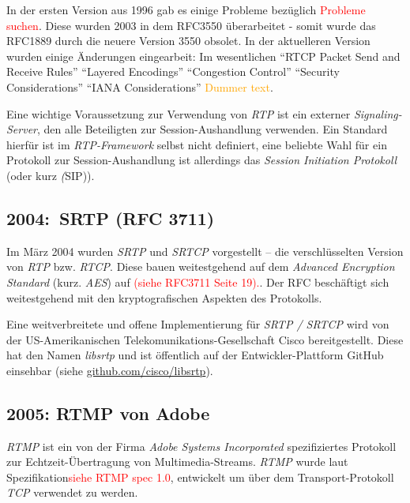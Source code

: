 \documentclass[journal]{IEEEtran}
\begin{document}
\begin{twocolumn}
In der ersten Version aus 1996 gab es einige Probleme bezüglich
\textcolor{red}{Probleme suchen}. Diese wurden 2003 in dem RFC3550
überarbeitet - somit wurde das RFC1889 durch die neuere Version 3550 obsolet.
In der aktuelleren Version wurden einige Änderungen eingearbeit: Im
wesentlichen ``RTCP Packet Send and Receive Rules'' ``Layered Encodings''
``Congestion Control'' ``Security Considerations'' ``IANA Considerations''
\textcolor{orange}{Dummer text}.

Eine wichtige Voraussetzung zur Verwendung von \textit{RTP} ist ein externer
\textit{Signaling-Server}, den alle Beteiligten zur Session-Aushandlung
verwenden. Ein Standard hierfür ist im \textit{RTP-Framework} selbst nicht
definiert, eine beliebte Wahl für ein Protokoll zur Session-Aushandlung ist
allerdings das \textit{Session Initiation Protokoll} (oder kurz \textit(SIP)).

\subsection{2004:\ SRTP (RFC 3711)}

Im März 2004 wurden \textit{SRTP} und \textit{SRTCP} vorgestellt – die
verschlüsselten Version von \textit{RTP} bzw. \textit{RTCP}. Diese bauen
weitestgehend auf dem \textit{Advanced Encryption Standard} (kurz.
\textit{AES}) auf \textcolor{red}{(siehe RFC3711 Seite 19).}. Der RFC
beschäftigt sich weitestgehend mit den kryptografischen Aspekten des
Protokolls.

Eine weitverbreitete und offene Implementierung für \textit{SRTP / SRTCP}
wird von der US-Amerikanischen Telekomunikations-Gesellschaft Cisco
bereitgestellt. Diese hat den Namen \textit{libsrtp} und ist öffentlich auf der
Entwickler-Plattform GitHub einsehbar (siehe
\href{https://github.com/cisco/libsrtp}{github.com/cisco/libsrtp}).


\subsection{2005: RTMP von Adobe}

\textit{RTMP} ist ein von der Firma \textit{Adobe Systems Incorporated}
spezifiziertes Protokoll zur Echtzeit-Übertragung von Multimedia-Streams.
\textit{RTMP} wurde laut Spezifikation\textcolor{red}{siehe RTMP spec 1.0},
entwickelt um über dem Transport-Protokoll \textit{TCP} verwendet zu werden.


\end{twocolumn}
\end{document}
